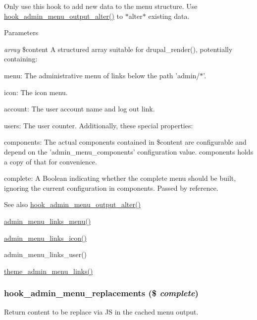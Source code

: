 Only use this hook to add new data to the menu structure. Use \hyperlink{admin__menu_8api_8php_a7502be228e9b3e1a04cbc17fa0e42b25}{hook\_\-admin\_\-menu\_\-output\_\-alter()} to $\ast$alter$\ast$ existing data.


\begin{DoxyParams}{Parameters}
\item[{\em array}]\$content A structured array suitable for drupal\_\-render(), potentially containing:
\begin{DoxyItemize}
\item menu: The administrative menu of links below the path 'admin/$\ast$'.
\item icon: The icon menu.
\item account: The user account name and log out link.
\item users: The user counter. Additionally, these special properties:
\item components: The actual components contained in \$content are configurable and depend on the 'admin\_\-menu\_\-components' configuration value. components holds a copy of that for convenience.
\item complete: A Boolean indicating whether the complete menu should be built, ignoring the current configuration in components. Passed by reference.
\end{DoxyItemize}\end{DoxyParams}
\begin{DoxySeeAlso}{See also}
\hyperlink{admin__menu_8api_8php_a7502be228e9b3e1a04cbc17fa0e42b25}{hook\_\-admin\_\-menu\_\-output\_\-alter()} 

\hyperlink{admin__menu_8inc_afbb93090bb402d1d524e666d370ffec5}{admin\_\-menu\_\-links\_\-menu()} 

\hyperlink{admin__menu_8inc_abb0305b57b5e84d5bb49059d16e55aa0}{admin\_\-menu\_\-links\_\-icon()} 

admin\_\-menu\_\-links\_\-user() 

\hyperlink{admin__menu_8module_a33d1120bbd0ebf32f21f44c17b831475}{theme\_\-admin\_\-menu\_\-links()} 
\end{DoxySeeAlso}
\hypertarget{admin__menu_8api_8php_af3a48610c3fd1e828a053625d0184fa1}{
\subsubsection[{hook\_\-admin\_\-menu\_\-replacements}]{\setlength{\rightskip}{0pt plus 5cm}hook\_\-admin\_\-menu\_\-replacements (\$ {\em complete})}}
\label{admin__menu_8api_8php_af3a48610c3fd1e828a053625d0184fa1}
Return content to be replace via JS in the cached menu output.


